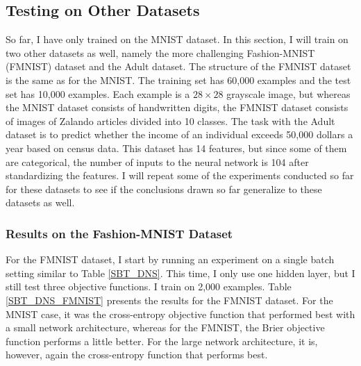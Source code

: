
\subsection{Testing on Other Datasets}
So far, I have only trained on the MNIST dataset. In this section, I will train on two other datasets as well, namely the more challenging Fashion-MNIST (FMNIST) dataset and the Adult dataset. The structure of the FMNIST dataset is the same as for the MNIST. The training set has 60,000 examples and the test set has 10,000 examples. Each example is a $28 \times 28$ grayscale image, but whereas the MNIST dataset consists of handwritten digits, the FMNIST dataset consists of images of Zalando articles divided into 10 classes. The task with the Adult dataset is to predict whether the income of an individual exceeds 50,000 dollars a year based on census data. This dataset has 14 features, but since some of them are categorical, the number of inputs to the neural network is 104 after standardizing the features. I will repeat some of the experiments conducted so far for these datasets to see if the conclusions drawn so far generalize to these datasets as well. 

\subsubsection{Results on the Fashion-MNIST Dataset}

For the FMNIST dataset, I start by running an experiment on a single batch setting similar to Table \ref{SBT_DNS}. This time, I only use one hidden layer, but I still test three objective functions. I train on 2,000 examples. Table \ref{SBT_DNS_FMNIST} presents the results for the FMNIST dataset. For the MNIST case, it was the cross-entropy objective function that performed best with a small network architecture, whereas for the FMNIST, the Brier objective function performs a little better. For the large network architecture, it is, however, again the cross-entropy function that performs best. \\

